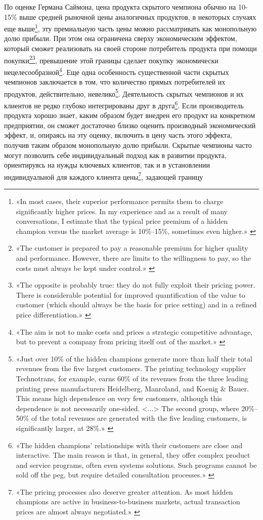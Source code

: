 \documentclass{article}
\begin{document}
По оценке Германа Саймона, цена продукта скрытого чемпиона обычно на 10-15\% выше средней рыночной цены аналогичных продуктов, в некоторых случаях еще выше\footnote{«In most cases, their superior performance permits them to charge significantly higher prices. In my experience and as a result of many conversations, I estimate that the typical price premium of a hidden champion versus the market average is 10\%–15\%, sometimes even higher.» \cite{hiddenChampions2009}}, эту премиальную часть цены можно рассматривать как монопольную долю прибыли. При этом она ограничена сверху экономическим эффектом, который сможет реализовать на своей стороне потребитель продукта при помощи покупки\footnote{«The customer is prepared to pay a reasonable premium for higher quality and performance. However, there are limits to the willingness to pay, so the costs must always be kept under control.» \cite{hiddenChampions2009}}\footnote{«The opposite is probably true: they do not fully exploit their pricing power. There is considerable potential for improved quantification of the value to customer (which should always be the basis for price setting) and in a refined price differentiation.» \cite{hiddenChampions2009}}, превышение этой границы сделает покупку экономически нецелесообразной\footnote{«The aim is not to make costs and prices a strategic competitive advantage, but to prevent a company from pricing itself out of the market.» \cite{hiddenChampions2009}}. Еще одна особенность существенной части скрытых чемпионов заключается в том, что количество прямых потребителей их продуктов, действительно, невелико\footnote{«Just over 10\% of the hidden champions generate more than half their total revenues from the five largest customers. The printing technology supplier Technotrans, for example, earns 60\% of its revenues from the three leading printing press manufacturers Heidelberg, Manroland, and Koenig \& Bauer. This means high dependence on very few customers, although this dependence is not necessarily one-sided. <...> The second group, where 20\%–50\% of the total revenues are generated with the five leading customers, is significantly larger, at 28\%.» \cite{hiddenChampions2009}}. Деятельность скрытых чемпионов и их клиентов не редко глубоко интегрированы друг в друга\footnote{«The hidden champions’ relationships with their customers are close and interactive. The main reason is that, in general, they offer complex product and service programs, often even systems solutions. Such programs cannot be sold off the peg, but require detailed consultation processes.» \cite{hiddenChampions2009}}. Если производитель продукта хорошо знает, каким образом будет внедрен его продукт на конкретном предприятии, он сможет достаточно близко оценить производный экономический эффект, и, опираясь на эту оценку, включить в цену часть этого эффекта, получив таким образом монопольную долю прибыли. Скрытые чемпионы часто могут позволить себе индивидуальный подход как в развитии продукта, ориентируясь на нужды ключевых клиентов, так и в установлении индивидуальной для каждого клиента цены\footnote{«The pricing processes also deserve greater attention. As most hidden champions are active in business-to-business markets, actual transaction prices are almost always negotiated.» \cite{hiddenChampions2009}}, задающей границу 
\end{document}
